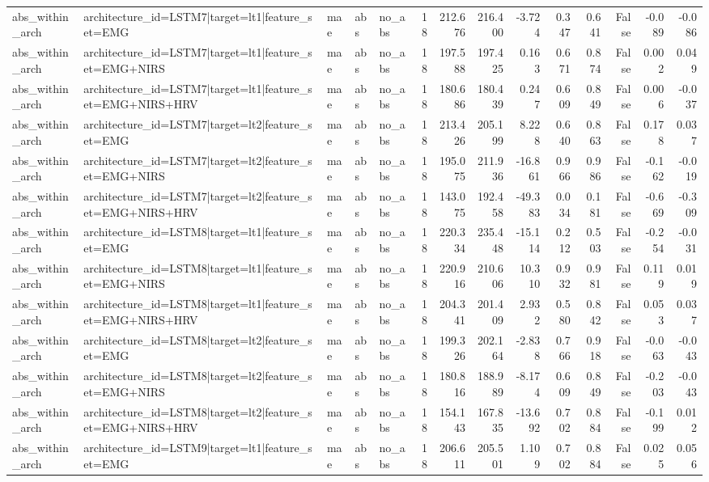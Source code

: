 \begin{table}
\begin{tabular}{lllllrrrrrrrrr}
abs_within_arch & architecture_id=LSTM7|target=lt1|feature_set=EMG & mae & abs & no_abs & 18 & 212.676 & 216.400 & -3.724 & 0.347 & 0.641 & False & -0.089 & -0.086 \\
abs_within_arch & architecture_id=LSTM7|target=lt1|feature_set=EMG+NIRS & mae & abs & no_abs & 18 & 197.588 & 197.425 & 0.163 & 0.671 & 0.874 & False & 0.002 & 0.049 \\
abs_within_arch & architecture_id=LSTM7|target=lt1|feature_set=EMG+NIRS+HRV & mae & abs & no_abs & 18 & 180.686 & 180.439 & 0.247 & 0.609 & 0.849 & False & 0.006 & -0.037 \\
abs_within_arch & architecture_id=LSTM7|target=lt2|feature_set=EMG & mae & abs & no_abs & 18 & 213.426 & 205.199 & 8.228 & 0.640 & 0.863 & False & 0.178 & 0.037 \\
abs_within_arch & architecture_id=LSTM7|target=lt2|feature_set=EMG+NIRS & mae & abs & no_abs & 18 & 195.075 & 211.936 & -16.861 & 0.966 & 0.986 & False & -0.162 & -0.019 \\
abs_within_arch & architecture_id=LSTM7|target=lt2|feature_set=EMG+NIRS+HRV & mae & abs & no_abs & 18 & 143.075 & 192.458 & -49.383 & 0.034 & 0.181 & False & -0.669 & -0.309 \\
abs_within_arch & architecture_id=LSTM8|target=lt1|feature_set=EMG & mae & abs & no_abs & 18 & 220.334 & 235.448 & -15.114 & 0.212 & 0.503 & False & -0.254 & -0.031 \\
abs_within_arch & architecture_id=LSTM8|target=lt1|feature_set=EMG+NIRS & mae & abs & no_abs & 18 & 220.916 & 210.606 & 10.310 & 0.932 & 0.981 & False & 0.119 & 0.019 \\
abs_within_arch & architecture_id=LSTM8|target=lt1|feature_set=EMG+NIRS+HRV & mae & abs & no_abs & 18 & 204.341 & 201.409 & 2.932 & 0.580 & 0.842 & False & 0.053 & 0.037 \\
abs_within_arch & architecture_id=LSTM8|target=lt2|feature_set=EMG & mae & abs & no_abs & 18 & 199.326 & 202.164 & -2.838 & 0.766 & 0.918 & False & -0.063 & -0.043 \\
abs_within_arch & architecture_id=LSTM8|target=lt2|feature_set=EMG+NIRS & mae & abs & no_abs & 18 & 180.816 & 188.989 & -8.174 & 0.609 & 0.849 & False & -0.203 & -0.043 \\
abs_within_arch & architecture_id=LSTM8|target=lt2|feature_set=EMG+NIRS+HRV & mae & abs & no_abs & 18 & 154.143 & 167.835 & -13.692 & 0.702 & 0.884 & False & -0.199 & 0.012 \\
abs_within_arch & architecture_id=LSTM9|target=lt1|feature_set=EMG & mae & abs & no_abs & 18 & 206.611 & 205.501 & 1.109 & 0.702 & 0.884 & False & 0.025 & 0.056 \\

\end{tabular}
\end{table}
